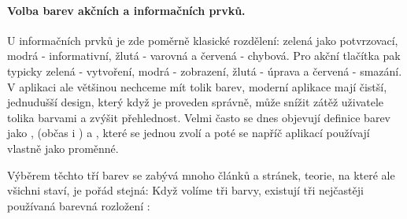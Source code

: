 \paragraph{Volba barev akčních a informačních prvků.} U informačních prvků je zde poměrně klasické rozdělení: zelená jako potvrzovací, modrá - informativní, žlutá - varovná a červená - chybová. Pro akční tlačítka pak typicky zelená - vytvoření, modrá - zobrazení, žlutá - úprava a červená - smazání. V aplikaci ale většinou nechceme mít tolik barev, moderní aplikace mají čistší, jednudušší design, který když je proveden správně, může snížit zátěž uživatele tolika barvami a zvýšit přehlednost. Velmi často se dnes objevují definice barev jako ,  (občas i ) a , které se jednou zvolí a poté se napříč aplikací používají vlastně jako proměnné.

Výběrem těchto tří barev se zabývá mnoho článků a stránek, teorie, na které ale všichni staví, je pořád stejná: Když volíme tři barvy, existují tři nejčastěji používaná barevná rozložení \cite{color-scheme-pick}:

